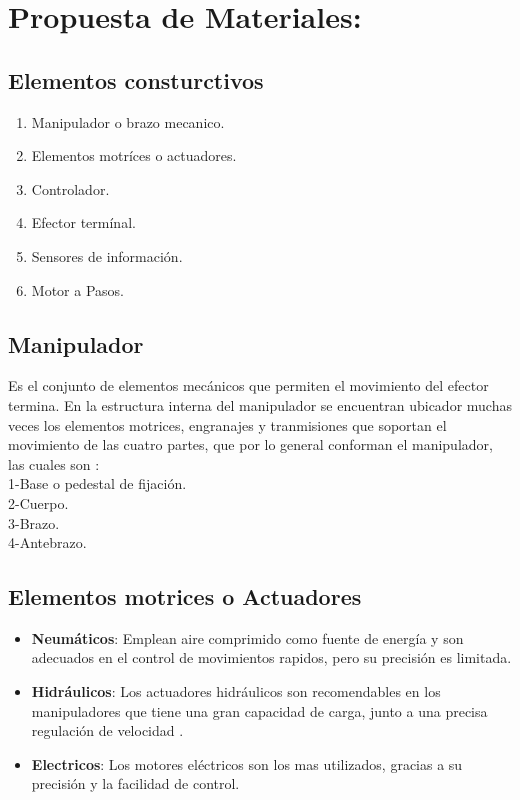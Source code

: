 \documentclass[14pt,a4paper]{article}
\begin{document}
\section{Propuesta de Materiales:}

\subsection{Elementos consturctivos}
\begin{enumerate}
\item Manipulador o brazo mecanico.
\item Elementos motríces o actuadores.
\item Controlador.
\item Efector termínal.
\item Sensores de información.
\item Motor a Pasos.
\end{enumerate}

\subsection{Manipulador}
Es el conjunto de elementos mecánicos que permiten el movimiento del efector termina. En la estructura interna del manipulador se encuentran ubicador muchas veces los elementos motrices, engranajes y tranmisiones que soportan el movimiento de las cuatro partes, que por lo general conforman el manipulador, las cuales son \citep{puglisi2006protesis}:\\
1-Base o pedestal de fijación.\\
2-Cuerpo.\\
3-Brazo.\\
4-Antebrazo.\\
\subsection{Elementos motrices o Actuadores}

\begin{itemize}
\item \textbf{Neumáticos}:
Emplean aire comprimido como fuente de energía y son adecuados en el control de movimientos rapidos, pero su precisión es limitada.\\
\item \textbf{Hidráulicos}:
Los actuadores hidráulicos son recomendables en los manipuladores que tiene una gran capacidad de carga, junto a una precisa regulación de velocidad \citep{turiel2002aplicaciones} .\\
\item \textbf{Electricos}:
Los motores eléctricos son los mas utilizados, gracias a su precisión y la facilidad de control.
\end{itemize}
\end{document}
